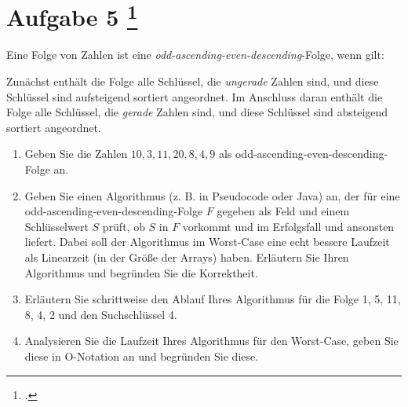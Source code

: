 \documentclass{lehramt-informatik-aufgabe}
\begin{document}
\section{Aufgabe 5
\footcite{66115:2020:09}}

Eine Folge von Zahlen ist eine \emph{odd-ascending-even-descending}-Folge, wenn gilt:

Zunächst enthält die Folge alle Schlüssel, die \emph{ungerade} Zahlen
sind, und diese Schlüssel sind aufsteigend sortiert angeordnet. Im
Anschluss daran enthält die Folge alle Schlüssel, die \emph{gerade}
Zahlen sind, und diese Schlüssel sind absteigend sortiert angeordnet.

\begin{enumerate}
\item Geben Sie die Zahlen $10, 3, 11, 20, 8, 4, 9$ als
odd-ascending-even-descending-Folge an.

\item Geben Sie einen Algorithmus (z. B. in Pseudocode oder Java) an,
der für eine odd-ascending-even-descending-Folge $F$ gegeben als Feld
und einem Schlüsselwert $S$ prüft, ob $S$ in $F$ vorkommt und
 im Erfolgsfall und ansonsten 
liefert. Dabei soll der Algorithmus im Worst-Case eine echt bessere
Laufzeit als Linearzeit (in der Größe der Arrays) haben. Erläutern Sie
Ihren Algorithmus und begründen Sie die Korrektheit.


\item Erläutern Sie schrittweise den Ablauf Ihres Algorithmus für die
Folge 1, 5, 11, 8, 4, 2 und
den Suchschlüssel 4.


\item Analysieren Sie die Laufzeit Ihres Algorithmus für den Worst-Case,
geben Sie diese in O-Notation an und begründen Sie diese.

\end{enumerate}
\end{document}
